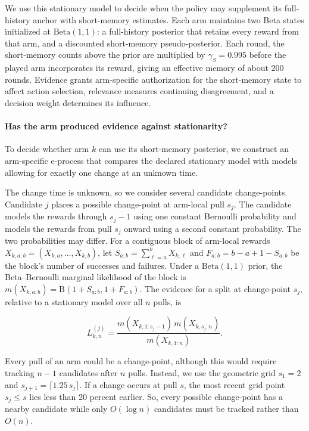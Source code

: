 \documentclass{article}
\newcommand{\1}{\mathbf 1}
\begin{document}
We use this stationary model to decide when the policy may supplement its
full-history anchor with short-memory estimates.
Each arm maintains two Beta states initialized at $\mathrm{Beta}(1,1)$:
a full-history posterior that retains every reward from that arm, and a
discounted short-memory pseudo-posterior.
Each round, the short-memory counts above the prior are multiplied by
$\gamma_S=0.995$ before the played arm incorporates its reward,
giving an effective memory of about 200 rounds.
Evidence grants arm-specific authorization for the short-memory state
to affect action selection, relevance measures continuing disagreement,
and a decision weight determines its influence.

\paragraph{Has the arm produced evidence against stationarity?}
To decide whether arm $k$ can use its short-memory posterior, we construct an
arm-specific e-process that compares the declared stationary model with
models allowing for exactly one change at an unknown time.

The change time is unknown, so we consider several candidate change-points. Candidate $j$ places a possible change-point at arm-local pull $s_j$. The candidate models the rewards through $s_j - 1$ using one constant Bernoulli probability and models the rewards from pull $s_j$ onward using a second constant probability. The two probabilities may differ.
For a contiguous block of arm-local rewards
$X_{k,a:b}=(X_{k,a},\ldots,X_{k,b})$, let
$S_{a:b}=\sum_{\ell=a}^b X_{k,\ell}$ and
$F_{a:b}=b-a+1-S_{a:b}$ be the block's number of successes and failures.
Under a $\mathrm{Beta}(1,1)$ prior, the Beta--Bernoulli marginal likelihood of the block is
$m(X_{k,a:b})=\mathrm B(1+S_{a:b},1+F_{a:b})$.
The evidence for a split at change-point $s_j$, relative to a
stationary model over all $n$ pulls, is

\begin{equation}
 L_{k,n}^{(j)}=
 \frac{m(X_{k,1:s_j-1})\,m(X_{k,s_j:n})}{m(X_{k,1:n})}.
 \label{eq:ecomponent}
\end{equation}

Every pull of an arm could be a change-point, although this would require tracking $n-1$ candidates after $n$ pulls.
Instead, we use the geometric grid $s_1=2$ and $s_{j+1}=\lceil1.25\,s_j\rceil$.
If a change occurs at pull $s$, the most recent grid point $s_j\le s$ lies less than 20 percent
earlier.
So, every possible change-point has a nearby candidate while
only $O(\log n)$ candidates must be tracked rather than $O(n)$.
\end{document}
